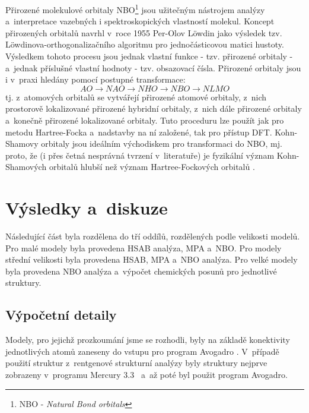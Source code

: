 \documentclass[
digital, %
table,   %
lof,     %
lot,     %
oneside,
]{fithesis3}
\begin{document}
Přirozené molekulové orbitaly NBO\footnote{NBO - \textit{Natural Bond orbitals}} jsou užitečným nástrojem analýzy a~interpretace vazebných i spektroskopických vlastností molekul. Koncept přirozených orbitalů navrhl v~roce 1955 Per-Olov Löwdin jako výsledek tzv. Löwdinova-orthogonalizačního algoritmu pro jednočásticovou matici hustoty. Výsledkem tohoto procesu jsou jednak vlastní funkce - tzv. přirozené orbitaly - a~jednak příslušné vlastní hodnoty - tzv. obsazovací čísla. Přirozené orbitaly jsou i v~praxi hledány pomocí postupné transformace:
\begin{displaymath}
AO \longrightarrow NAO \longrightarrow NHO \longrightarrow NBO \longrightarrow NLMO
\end{displaymath}
tj. z~atomových orbitalů se vytvářejí přirozené atomové orbitaly, z~nich prostorově lokalizované přirozené hybridní orbitaly, z~nich dále přirozené orbitaly  a~konečně přirozené lokalizované orbitaly. Tuto proceduru lze použít jak pro metodu Hartree-Focka a~nadstavby na ní založené, tak pro přístup DFT. Kohn-Shamovy orbitaly jsou ideálním východiskem pro transformaci do NBO, mj. proto, že (i přes četná nesprávná tvrzení v~literatuře) je fyzikální význam Kohn-Shamových orbitalů hlubší než význam Hartree-Fockových orbitalů \cite{Bickelhauptdftreview}.

\chapter{Výsledky a~diskuze}
Následující část byla rozdělena do tří oddílů, rozdělených podle velikosti modelů. Pro malé modely byla provedena HSAB analýza, MPA a~NBO. Pro modely střední velikosti byla provedena HSAB, MPA a~NBO analýza. Pro velké modely byla provedena NBO analýza a~výpočet chemických posunů pro jednotlivé struktury.

\section{Výpočetní detaily}
Modely, pro jejichž prozkoumání jsme se rozhodli, byly na základě konektivity jednotlivých atomů zaneseny do vstupu pro program Avogadro \cite{Avogadro}. V~případě použití struktur z~rentgenové strukturní analýzy byly struktury nejprve zobrazeny v~programu Mercury 3.3~\cite{Mercury} a~až poté byl použit program Avogadro.
\end{document}
